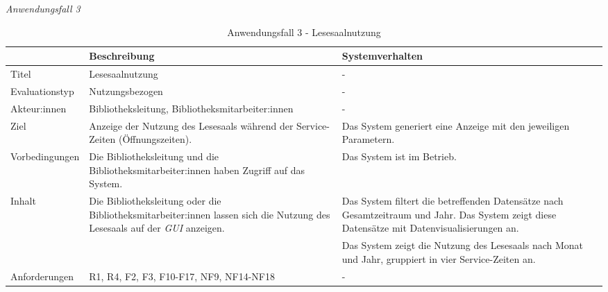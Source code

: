 \newpage
\noindent
\textit{Anwendungsfall 3}

\begingroup
\setlength{\tabcolsep}{10pt} %
\renewcommand{\arraystretch}{1.25} 
\begin{table}[h]
    \centering
    \begin{adjustbox}{max width=\textwidth}
    \begin{tabular}{lp{7.0cm}p{7.0cm}}
       \toprule
       \textbf{}          & \textbf{Beschreibung} &\textbf{Systemverhalten}\\
       \midrule
        Titel                            &Lesesaalnutzung& -\\
        Evaluationstyp                   &Nutzungsbezogen                   & -\\
        Akteur:innen                     &Bibliotheksleitung, Bibliotheksmitarbeiter:innen& -\\
        Ziel                             &Anzeige der Nutzung des Lesesaals während der Service-Zeiten (Öffnungszeiten).& Das System generiert eine Anzeige mit den jeweiligen Parametern.\\
        Vorbedingungen                   &Die Bibliotheksleitung und die Bibliotheksmitarbeiter:innen haben Zugriff auf das System.& Das System ist im Betrieb.\\
        Inhalt                          &Die Bibliotheksleitung oder die Bibliotheksmitarbeiter:innen lassen sich die Nutzung des Lesesaals auf der \textit{\acrshort{GUI}} anzeigen. & Das System filtert die betreffenden Datensätze nach Gesamtzeitraum und Jahr. Das System zeigt diese Datensätze mit Datenvisualisierungen an.\\
                                         & &Das System zeigt die Nutzung des Lesesaals nach Monat und Jahr, gruppiert in vier Service-Zeiten an.\\

        Anforderungen                   &R1, R4, F2, F3, F10-F17, NF9, NF14-NF18& -\\
        \bottomrule
    \end{tabular}
    \end{adjustbox}
    \caption{%
    Anwendungsfall 3 - Lesesaalnutzung    }
    \label{tab:AF_Lesesaalnutzung}
    \end{table}
\endgroup


